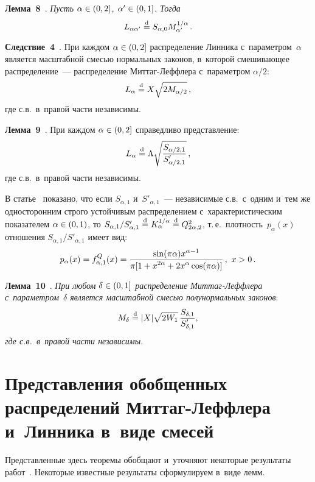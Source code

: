 \begin{multicols}{2}
\smallskip

\noindent
\textbf{Лемма~8}~\cite{KorolevZeifmanKMJ}. \textit{Пусть $\alpha\hm\in(0,2]$,
$\alpha'\hm\in(0,1]$. Тогда}
$$
L_{\alpha\alpha'}\stackrel{\mathrm{d}}{=} S_{\alpha,0}M_{\alpha'}^{1/\alpha}\,.
$$


\noindent
\textbf{Следствие~4}~\cite{KorolevZeifmanKMJ}.  При каждом
$\alpha\hm\in(0,2]$ распределение Линника с~параметром~$\alpha$
является масштабной смесью нормальных законов, в~которой сме\-ши\-ва\-ющее
распределение~---  распределение Мит\-таг-Леф\-фле\-ра с~параметром
$\alpha/2$:
\begin{equation}
L_{\alpha}\stackrel{\mathrm{d}}{=} X\sqrt{2M_{\alpha/2}}\,,
\label{e12-kgz}
\end{equation}
где с.в.\ в~правой части независимы.

\smallskip

\noindent
\textbf{Лемма~9}~\cite{KorolevZeifmanKMJ}. При каждом
$\alpha\hm\in(0,2]$ справедливо представление:
$$
L_{\alpha}\stackrel{\mathrm{d}}{=} \Lambda\sqrt{\displaystyle\frac{\displaystyle S_{\alpha/2,1}\mathstrut}{\displaystyle S'_{\alpha/2,1}\mathstrut}}\,,
$$
где с.в.\ в~правой части независимы.

\smallskip

В статье~\cite{KorolevZeifmanKMJ} показано, что если $S_{\alpha,1}$
и~$S'_{\alpha,1}$~--- независимые с.в.\ с~одним и~тем же
односторонним строго устойчивым распределением с~характеристическим
показателем $\alpha\hm\in(0,1)$, то $S_{\alpha,1}/S'_{\alpha,1}\hm\eqd
K_{\alpha}^{1/\alpha}\hm\eqd Q_{2\alpha,2}^2$, т.\,е.\ плот\-ность~$p_{\alpha}(x)$ 
отношения $S_{\alpha,1}/S'_{\alpha,1}$ имеет вид:
$$
p_{\alpha}(x)=f_{\alpha,1}^{Q}(x)=\fr{\sin(\pi\alpha)x^{\alpha-1}}
{\pi[1+x^{2\alpha}+2x^{\alpha}\cos(\pi\alpha)]}\,,\ 
 x>0\,.
$$

\smallskip

\noindent
\textbf{Лемма~10}~\cite{KorolevZeifmanKMJ}. \textit{При любом
$\delta\hm\in(0,1]$ распределение Мит\-таг-Леф\-фле\-ра с~параметром~$\delta$
является масштабной смесью полунормальных законов}:
$$
M_{\delta}\stackrel{\mathrm{d}}{=}
|X| \sqrt{2W_1}\, \displaystyle\frac{\displaystyle S_{\delta,1}\mathstrut}{\displaystyle S'_{\delta,1}\mathstrut},
$$
\textit{где с.в.\ в~правой части независимы}.

\section{Представления обобщенных распределений Миттаг-Леффлера 
и~Линника в~виде смесей}

Представленные здесь теоремы обобщают 
и~уточняют некоторые результаты работ~\cite{Pakes1998, LimTeo2009,
Mathai2010, MathaiHaubold2011, Joseetal}. Некоторые известные
результаты сформулируем в~виде лемм.


\end{multicols}
